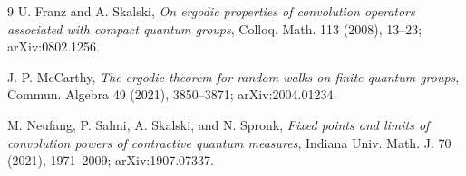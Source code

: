 \documentclass[11pt]{article}
\theoremstyle{remark}
\begin{document}
\begin{thebibliography}{9}
U. Franz and A. Skalski,
\emph{On ergodic properties of convolution operators associated with compact
quantum groups}, Colloq. Math. 113 (2008), 13--23; arXiv:0802.1256.

J. P. McCarthy,
\emph{The ergodic theorem for random walks on finite quantum groups},
Commun. Algebra 49 (2021), 3850--3871; arXiv:2004.01234.

M. Neufang, P. Salmi, A. Skalski, and N. Spronk,
\emph{Fixed points and limits of convolution powers of contractive quantum
measures}, Indiana Univ. Math. J. 70 (2021), 1971--2009;
arXiv:1907.07337.
\end{thebibliography}
\end{document}
